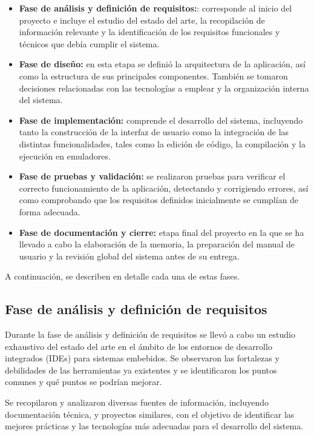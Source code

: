 \documentclass[../../main.tex]{subfiles}
\begin{document}
\begin{itemize}
    \item \textbf{Fase de análisis y definición de requisitos:}: corresponde al inicio del proyecto e incluye el estudio del estado del arte, la recopilación de información relevante y la identificación de los requisitos funcionales y técnicos que debía cumplir el sistema.
    \item \textbf{Fase de diseño:} en esta etapa se definió la arquitectura de la aplicación, así como la estructura de sus principales componentes. También se tomaron decisiones relacionadas con las tecnologías a emplear y la organización interna del sistema.
    \item \textbf{Fase de implementación:} comprende el desarrollo del sistema, incluyendo tanto la construcción de la interfaz de usuario como la integración de las distintas funcionalidades, tales como la edición de código, la compilación y la ejecución en emuladores.
    \item \textbf{Fase de pruebas y validación:} se realizaron pruebas para verificar el correcto funcionamiento de la aplicación, detectando y corrigiendo errores, así como comprobando que los requisitos definidos inicialmente se cumplían de forma adecuada.
    \item \textbf{Fase de documentación y cierre:} etapa final del proyecto en la que se ha llevado a cabo la elaboración de la memoria, la preparación del manual de usuario y la revisión global del sistema antes de su entrega.
\end{itemize}

A continuación, se describen en detalle cada una de estas fases.
 
\subsection{Fase de análisis y definición de requisitos}

Durante la fase de análisis y definición de requisitos se llevó a cabo un estudio exhaustivo del estado del arte en el ámbito de los entornos de desarrollo integrados (IDEs) para sistemas embebidos. Se observaron las fortalezas y debilidades de las herramientas ya existentes y se identificaron los puntos comunes y qué puntos se podrían mejorar.

Se recopilaron y analizaron diversas fuentes de información, incluyendo documentación técnica, y proyectos similares, con el objetivo de identificar las mejores prácticas y las tecnologías más adecuadas para el desarrollo del sistema. 
\end{document}
